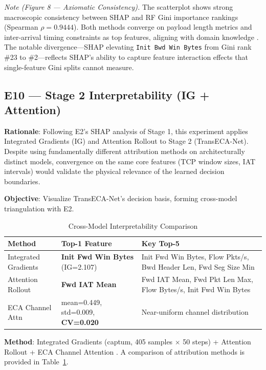 \documentclass[sigconf]{acmart}
\begin{document}
\textit{Note (Figure 8 --- Axiomatic Consistency).} The scatterplot shows strong macroscopic consistency between SHAP and RF Gini importance rankings (Spearman $\rho = 0.9444$). Both methods converge on payload length metrics and inter-arrival timing constraints as top features, aligning with domain knowledge \cite{1}. The notable divergence---SHAP elevating \texttt{Init Bwd Win Bytes} from Gini rank \#23 to \#2---reflects SHAP's ability to capture feature interaction effects that single-feature Gini splits cannot measure.

\subsection{E10 --- Stage 2 Interpretability (IG + Attention)}
\textbf{Rationale}: Following E2's SHAP analysis of Stage 1, this experiment applies Integrated Gradients (IG) and Attention Rollout to Stage 2 (TransECA-Net). Despite using fundamentally different attribution methods on architecturally distinct models, convergence on the same core features (TCP window sizes, IAT intervals) would validate the physical relevance of the learned decision boundaries.

\textbf{Objective}: Visualize TransECA-Net's decision basis, forming cross-model triangulation with E2.


\begin{table}[!t]
\caption{Cross-Model Interpretability Comparison}
\label{tab:interpretability_comparison}
\begin{tabular}{p{3.5cm}p{4.5cm}p{8.4cm}}
\toprule
\textbf{Method} & \textbf{Top-1 Feature} & \textbf{Key Top-5} \\
\midrule
Integrated Gradients & \textbf{Init Fwd Win Bytes} (IG=2.107) & Init Fwd Win Bytes, Flow Pkts/s, Bwd Header Len, Fwd Seg Size Min \\
Attention Rollout & \textbf{Fwd IAT Mean} & Fwd IAT Mean, Fwd Pkt Len Max, Flow Bytes/s, Init Fwd Win Bytes \\
ECA Channel Attn & mean=0.449, std=0.009, \textbf{CV=0.020} & Near-uniform channel distribution \\
\bottomrule
\end{tabular}
\end{table}

\textbf{Method}: Integrated Gradients (captum, 405 samples $\times$ 50 steps) + Attention Rollout \cite{9} + ECA Channel Attention \cite{18}. A comparison of attribution methods is provided in Table~\ref{tab:interpretability_comparison}.
\end{document}
